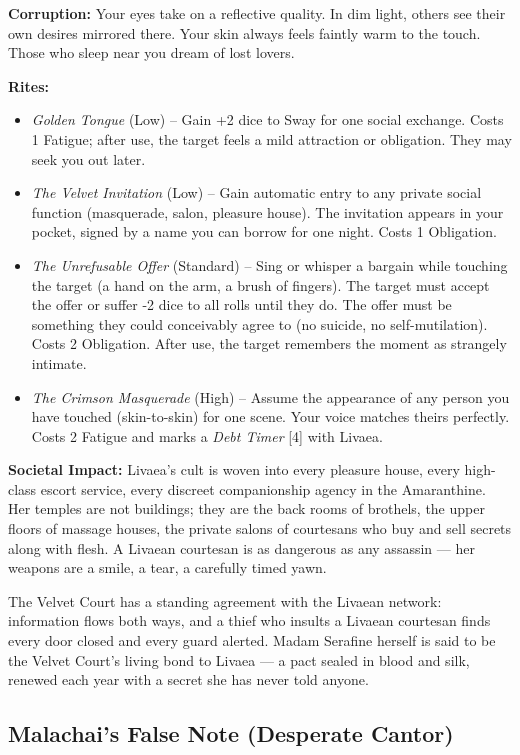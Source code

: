 \documentclass[10pt,twoside]{book}
\begin{document}
\textbf{Corruption:} Your eyes take on a reflective quality. In dim light, others see their own desires mirrored there. Your skin always feels faintly warm to the touch. Those who sleep near you dream of lost lovers.

\textbf{Rites:}
\begin{itemize}
\item \textit{Golden Tongue} (Low) -- Gain +2 dice to Sway for one social exchange. Costs 1 Fatigue; after use, the target feels a mild attraction or obligation. They may seek you out later.
\item \textit{The Velvet Invitation} (Low) -- Gain automatic entry to any private social function (masquerade, salon, pleasure house). The invitation appears in your pocket, signed by a name you can borrow for one night. Costs 1 Obligation.
\item \textit{The Unrefusable Offer} (Standard) -- Sing or whisper a bargain while touching the target (a hand on the arm, a brush of fingers). The target must accept the offer or suffer -2 dice to all rolls until they do. The offer must be something they could conceivably agree to (no suicide, no self-mutilation). Costs 2 Obligation. After use, the target remembers the moment as strangely intimate.
\item \textit{The Crimson Masquerade} (High) -- Assume the appearance of any person you have touched (skin-to-skin) for one scene. Your voice matches theirs perfectly. Costs 2 Fatigue and marks a \textit{Debt Timer } [4] with Livaea.
\end{itemize}

\textbf{Societal Impact:} Livaea's cult is woven into every pleasure house, every high-class escort service, every discreet companionship agency in the Amaranthine. Her temples are not buildings; they are the back rooms of brothels, the upper floors of massage houses, the private salons of courtesans who buy and sell secrets along with flesh. A Livaean courtesan is as dangerous as any assassin --- her weapons are a smile, a tear, a carefully timed yawn.

The Velvet Court has a standing agreement with the Livaean network: information flows both ways, and a thief who insults a Livaean courtesan finds every door closed and every guard alerted. Madam Serafine herself is said to be the Velvet Court's living bond to Livaea --- a pact sealed in blood and silk, renewed each year with a secret she has never told anyone.

\subsection{Malachai's False Note (Desperate Cantor)}
\end{document}
